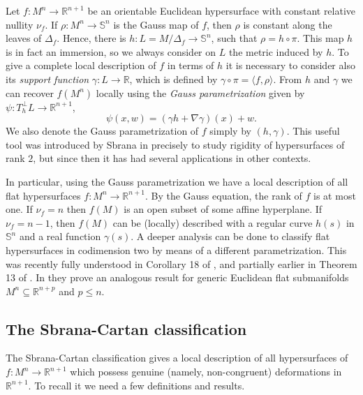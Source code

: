 \documentclass{article}
\theoremstyle{remark}
\begin{document}
Let $f:M^n\rightarrow\mathbb{R}^{n+1}$ be an orientable Euclidean hypersurface with constant relative nullity $\nu_f$. If $\rho:M^n\rightarrow\mathbb{S}^n$ is the Gauss map of $f$, then $\rho$ is constant along the leaves of $\Delta_f$. Hence, there is $h:L=M/\Delta_f\rightarrow \mathbb{S}^n$, such that $\rho=h\circ\pi$. This map $h$ is in fact an immersion, so we always consider on $L$ the metric induced by $h$. To give a complete local description of $f$ in terms of $h$ it is necessary to consider also its {\it support function} $\gamma:L\rightarrow\mathbb{R}$, which is defined by $\gamma\circ\pi=\langle f,\rho\rangle$. From $h$ and $\gamma$ we can recover $f(M^n)$ locally using the {\it Gauss parametrization} given by $\psi:T^\perp_hL\rightarrow\mathbb{R}^{n+1}$,
\begin{equation}\label{eq:parametrizacion de gauss}
    \psi(x,w)=(\gamma h+\nabla\gamma)(x)+w.
\end{equation}
We also denote the Gauss parametrization of $f$ simply by $(h,\gamma)$.
This useful tool was introduced by Sbrana in \cite{Sb} precisely to study rigidity of hypersurfaces of rank $2$, but since then it has had several applications in other contexts.

In particular, using the Gauss parametrization we have a local description of all flat hypersurfaces $f:M^n\rightarrow\mathbb{R}^{n+1}$. By the Gauss equation, the rank of $f$ is at most one. If $\nu_f=n$ then $f(M)$ is an open subset of some affine hyperplane. If $\nu_f=n-1$, then $f(M)$ can be (locally) described with a regular curve $h(s)$ in $\mathbb{S}^n$ and a real function $\gamma(s)$. A deeper analysis can be done to classify flat hypersurfaces in codimension two by means of a different parametrization. This was recently fully understood in Corollary 18 of \cite{FF}, and partially earlier in Theorem 13 of \cite{DF2}. In \cite{YoFlatE} they prove an analogous result for generic Euclidean flat submanifolds $M^n\subseteq \mathbb{R}^{n+p}$ and $p\leq n$.

\subsection{The Sbrana-Cartan classification}\label{subseccion SB clasificacion}
The Sbrana-Cartan classification gives a local description of all hypersurfaces of $f:M^n\rightarrow\mathbb{R}^{n+1}$ which possess genuine (namely, non-congruent) deformations in $\mathbb{R}^{n+1}$. To recall it we need a few definitions and results. 
\end{document}
